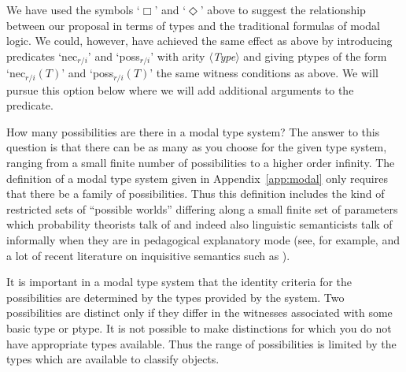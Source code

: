  
 
   

We have used the symbols `$\Box$' and `$\Diamond$' above to suggest
the relationship between our proposal in terms of types and the
traditional formulas of modal logic.  We could, however, have achieved
the same effect as above by introducing predicates `nec$_{r/i}$' and `poss$_{r/i}$'
with arity
$\langle$\textit{Type}$\rangle$ and giving ptypes of the form
`nec$_{r/i}(T)$' and `poss$_{r/i}(T)$' the same witness conditions as
above. %
% 
% 
% 
%   
We will pursue this option below where we will add additional arguments to the predicate.   
   
How many possibilities are there in a modal type system?  The answer
to this question is that there can be as many as you choose for the
given type system, ranging from a small finite number of possibilities
to a higher order infinity.  The definition of a modal type system
given in Appendix~\ref{app:modal} only requires that there be a family
of possibilities.  Thus this definition includes the kind of
restricted sets of ``possible worlds'' differing along a small finite
set of parameters which probability theorists talk of and indeed also
linguistic semanticists talk of informally when they are in pedagogical
explanatory mode (see, for example, \citealp{DowtyWallPeters1981} and
a lot of recent literature on inquisitive semantics such as
\citealp{GroenendijkRoelofsen2012}).  

It is important in a modal type system that the identity criteria for
the possibilities are determined by the types provided by the system.
Two possibilities are distinct only if they differ in the witnesses
associated with some basic type or ptype.  It is not possible to make
distinctions for which you do not have appropriate types available.
Thus the range of possibilities is limited by the types which are
available to classify objects.

